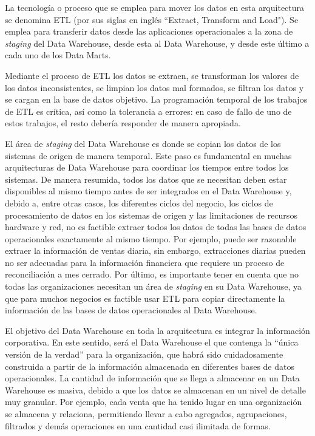 \documentclass[a4paper, 12pt]{book}
\begin{document}
La tecnología o proceso que se emplea para mover los datos en esta arquitectura se denomina ETL (por sus siglas en inglés ``Extract, Transform and Load"). Se emplea para transferir datos desde las aplicaciones operacionales a la zona de \textit{staging} del Data Warehouse, desde esta al Data Warehouse, y desde este último a cada uno de los Data Marts.

Mediante el proceso de ETL los datos se extraen, se transforman los valores de los datos inconsistentes, se limpian los datos mal formados, se filtran los datos y se cargan en la base de datos objetivo. La programación temporal de los trabajos de ETL es crítica, así como la tolerancia a errores: en caso de fallo de uno de estos trabajos, el resto debería responder de manera apropiada.

El área de \textit{staging} del Data Warehouse es donde se copian los datos de los sistemas de origen de manera temporal. Este paso es fundamental en muchas arquitecturas de Data Warehouse para coordinar los tiempos entre todos los sistemas. De manera resumida, todos los datos que se necesitan deben estar disponibles al mismo tiempo antes de ser integrados en el Data Warehouse y, debido a, entre otras casos, los diferentes ciclos del negocio, los ciclos de procesamiento de datos en los sistemas de origen y las limitaciones de recursos hardware y red, no es factible extraer todos los datos de todas las bases de datos operacionales exactamente al mismo tiempo. Por ejemplo, puede ser razonable extraer la información de ventas diaria, sin embargo, extracciones diarias pueden no ser adecuadas para la información financiera que requiere un proceso de reconciliación a mes cerrado. Por último, es importante tener en cuenta que no todas las organizaciones necesitan un área de \textit{staging} en su Data Warehouse, ya que para muchos negocios es factible usar ETL para copiar directamente la información de las bases de datos operacionales al Data Warehouse.

El objetivo del Data Warehouse en toda la arquitectura es integrar la información corporativa. En este sentido, será el Data Warehouse el que contenga la “única versión de la verdad” para la organización, que habrá sido cuidadosamente construida a partir de la información almacenada en diferentes bases de datos operacionales. La cantidad de información que se llega a almacenar en un Data Warehouse es masiva, debido a que los datos se almacenan en un nivel de detalle muy granular. Por ejemplo, cada venta que ha tenido lugar en una organización se almacena y relaciona, permitiendo llevar a cabo agregados, agrupaciones, filtrados y demás operaciones en una cantidad casi ilimitada de formas.
\end{document}
